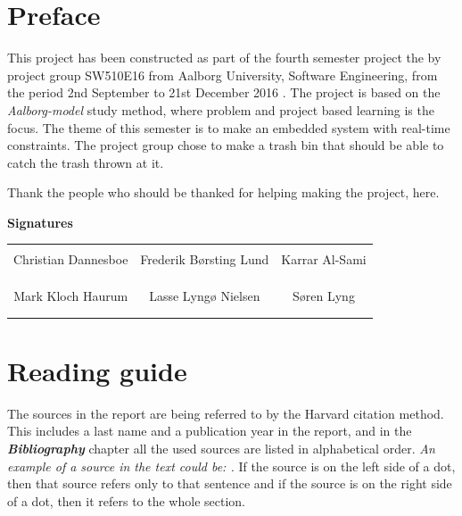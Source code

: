 \chapter*{Preface}
This project has been constructed as part of the fourth semester project the by project group SW510E16 from Aalborg University, Software Engineering, from the period 2nd September to 21st December 2016 . \newline
The project is based on the \textit{Aalborg-model} study method, where problem and project based learning is the focus. The theme of this semester is to make an embedded system with real-time constraints. The project group chose to make a trash bin that should be able to catch the trash thrown at it. \newline

Thank the people who should be thanked for helping making the project, here. 
\newline
\newline
\newline
\newline

{\Huge\textbf{Signatures}}
\newline
\newline

\begin{table}[H]
	\centering
		\begin{tabular}{c c c}
			\underline{\phantom{mmmmmmmmmmmmmm}} & \underline{\phantom{mmmmmmmmmmmmmm}} & \underline{\phantom{mmmmmmmmmmmmmm}} \\
			Christian Dannesboe			& Frederik Børsting Lund 		& Karrar Al-Sami 			\\
			&&\\
			&&\\
			\underline{\phantom{mmmmmmmmmmmmmm}} & \underline{\phantom{mmmmmmmmmmmmmm}} & \underline{\phantom{mmmmmmmmmmmmmm}} \\
			Mark Kloch Haurum			& Lasse Lyngø Nielsen 		& Søren Lyng 				\\
			&&\\
			&&\\
		 																		
		\end{tabular}
\end{table}

\chapter*{Reading guide}
The sources in the report are being referred to by the Harvard citation method. This includes a last name and a publication year in the report, and in the \textit{\textbf{Bibliography}} chapter all the used sources are listed in alphabetical order. \newline
\textit{An example of a source in the text could be: \textbf{\citep{Servo}}.}
\newline
If the source is on the left side of a dot, then that source refers only to that sentence and if the source is on the right side of a dot, then it refers to the whole section. 

